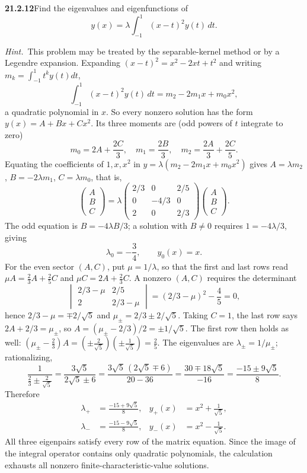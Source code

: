 \par\bigskip
\noindent\textbf{21.2.12}\quad Find the eigenvalues and
eigenfunctions of
\[
y(x)=\lambda\int_{-1}^{1}(x-t)^{2}y(t)\,dt.
\]
\par\emph{Hint.}~This problem may be treated by the
separable-kernel method or by a Legendre expansion.
\solution
Expanding $(x-t)^2=x^2-2xt+t^2$ and writing
$m_k=\int_{-1}^1t^ky(t)dt$,
\[
\int_{-1}^1(x-t)^2y(t)\,dt=m_2-2m_1x+m_0x^2,
\]
a quadratic polynomial in $x$. So every nonzero solution has the form
$y(x)=A+Bx+Cx^2$. Its three moments are (odd powers of $t$ integrate
to zero)
\[
m_0=2A+\frac{2C}{3},\quad
m_1=\frac{2B}{3},\quad
m_2=\frac{2A}{3}+\frac{2C}{5}.
\]
Equating the coefficients of $1,x,x^2$ in $y=\lambda(m_2-2m_1x+m_0x^2)$
gives $A=\lambda m_2$, $B=-2\lambda m_1$, $C=\lambda m_0$, that is,
\[
\begin{pmatrix}A\\B\\C\end{pmatrix}
=\lambda
\begin{pmatrix}
2/3&0&2/5\\
0&-4/3&0\\
2&0&2/3
\end{pmatrix}
\begin{pmatrix}A\\B\\C\end{pmatrix}.
\]
The odd equation is $B=-4\lambda B/3$; a solution with $B\ne0$
requires $1=-4\lambda/3$, giving
\[
\boxed{\lambda_0=-\frac34,\qquad y_0(x)=x}.
\]
For the even sector $(A,C)$, put $\mu=1/\lambda$, so that the first and
last rows read $\mu A=\frac23A+\frac25C$ and $\mu C=2A+\frac23C$.
A nonzero $(A,C)$ requires the determinant
\[
\begin{vmatrix}2/3-\mu&2/5\\2&2/3-\mu\end{vmatrix}
=(2/3-\mu)^2-\frac45=0,
\]
hence $2/3-\mu=\mp2/\sqrt5$ and $\mu_\pm=2/3\pm2/\sqrt5$. Taking $C=1$,
the last row says $2A+2/3=\mu_\pm$, so
$A=(\mu_\pm-2/3)/2=\pm1/\sqrt5$. The first row then holds as well:
$(\mu_\pm-\frac23)A=(\pm\frac2{\sqrt5})(\pm\frac1{\sqrt5})=\frac25$.
The eigenvalues are $\lambda_\pm=1/\mu_\pm$; rationalizing,
\[
\frac1{\frac23\pm\frac2{\sqrt5}}
=\frac{3\sqrt5}{2\sqrt5\pm6}
=\frac{3\sqrt5\,(2\sqrt5\mp6)}{20-36}
=\frac{30\mp18\sqrt5}{-16}
=\frac{-15\pm9\sqrt5}{8}.
\]
Therefore
\[
\boxed{\begin{aligned}
\lambda_+&=\frac{-15+9\sqrt5}{8},&
y_+(x)&=x^2+\frac1{\sqrt5},\\
\lambda_-&=\frac{-15-9\sqrt5}{8},&
y_-(x)&=x^2-\frac1{\sqrt5}.
\end{aligned}}
\]
All three eigenpairs satisfy every row of the matrix equation.
Since the image of the integral operator contains only quadratic
polynomials, the calculation exhausts all nonzero
finite-characteristic-value solutions.

